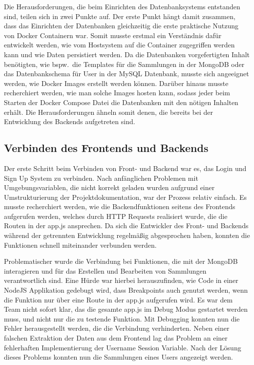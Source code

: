 Die Herausforderungen, die beim Einrichten des Datenbanksystems entstanden sind, teilen sich in zwei Punkte auf.
Der erste Punkt hängt damit zusammen, dass das Einrichten der Datenbanken gleichzeitig die erste praktische Nutzung von Docker Containern war.
Somit musste erstmal ein Verständnis dafür entwickelt werden, wie vom Hostsystem auf die Container zugegriffen werden kann und wie Daten persistiert werden.
Da die Datenbanken vorgefertigten Inhalt benötigten, wie bspw.\ die Templates für die Sammlungen in der MongoDB oder das Datenbankschema für User in der MySQL Datenbank, musste sich angeeignet werden, wie Docker Images erstellt werden können.
Darüber hinaus musste recherchiert werden, wie man solche Images hosten kann, sodass jeder beim Starten der Docker Compose Datei die Datenbanken mit den nötigen Inhalten erhält.
Die Herausforderungen ähneln somit denen, die bereits bei der Entwicklung des Backends aufgetreten sind.

\subsection{Verbinden des Frontends und Backends}\label{subsec:verbinden-des-frontends-und-backends}

Der erste Schritt beim Verbinden von Front- und Backend war es, das Login und Sign Up System zu verbinden.
Nach anfänglichen Problemen mit Umgebungsvariablen, die nicht korrekt geladen wurden aufgrund einer Umstrukturierung der Projektdokumentation, war der Prozess relativ einfach.
Es musste recherchiert werden, wie die Backendfunktionen seitens des Frontends aufgerufen werden, welches durch HTTP Requests realisiert wurde, die die Routen in der app.js ansprechen.
Da sich die Entwickler des Front- und Backends während der getrennten Entwicklung regelmäßig abgesprochen haben, konnten die Funktionen schnell miteinander verbunden werden.

Problematischer wurde die Verbindung bei Funktionen, die mit der MongoDB interagieren und für das Erstellen und Bearbeiten von Sammlungen verantwortlich sind.
Eine Hürde war hierbei herauszufinden, wie Code in einer NodeJS Applikation gedebugt wird, dass Breakpoints auch genutzt werden, wenn die Funktion nur über eine Route in der app.js aufgerufen wird.
Es war dem Team nicht sofort klar, das die gesamte app.js im Debug Modus gestartet werden muss, und nicht nur die zu testende Funktion.
Mit Debugging konnten nun die Fehler herausgestellt werden, die die Verbindung verhinderten.
Neben einer falschen Extraktion der Daten aus dem Frontend lag das Problem an einer fehlerhaften Implementierung der Username Session Variable.
Nach der Lösung dieses Problems konnten nun die Sammlungen eines Users angezeigt werden.

